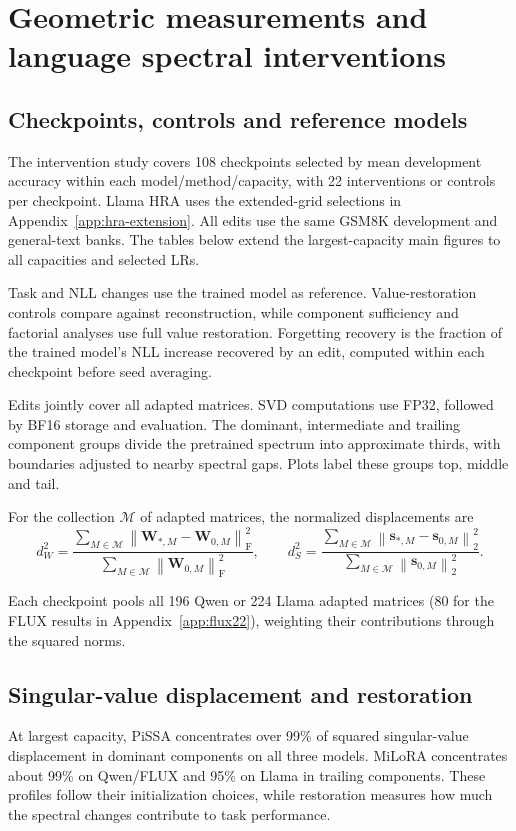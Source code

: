 \section{Geometric measurements and language spectral interventions}\label{app:complete-interventions}
\FloatBarrier
\subsection{Checkpoints, controls and reference models}
The intervention study covers 108 checkpoints selected by mean development accuracy within each model/method/capacity, with 22 interventions or controls per checkpoint. Llama HRA uses the extended-grid selections in Appendix~\ref{app:hra-extension}. All edits use the same GSM8K development and general-text banks. The tables below extend the largest-capacity main figures to all capacities and selected LRs.

Task and NLL changes use the trained model as reference. Value-restoration controls compare against reconstruction, while component sufficiency and factorial analyses use full value restoration. Forgetting recovery is the fraction of the trained model's NLL increase recovered by an edit, computed within each checkpoint before seed averaging.

Edits jointly cover all adapted matrices. SVD computations use FP32, followed by BF16 storage and evaluation. The dominant, intermediate and trailing component groups divide the pretrained spectrum into approximate thirds, with boundaries adjusted to nearby spectral gaps. Plots label these groups top, middle and tail.

For the collection $\mathcal M$ of adapted matrices, the normalized displacements are
\begin{equation*}
 d_W^2=\frac{\sum_{M\in\mathcal M}\left\|\bm W_{*,M}-\bm W_{0,M}\right\|_{\mathrm F}^2}{\sum_{M\in\mathcal M}\left\|\bm W_{0,M}\right\|_{\mathrm F}^2},\qquad
 d_S^2=\frac{\sum_{M\in\mathcal M}\left\|\bm s_{*,M}-\bm s_{0,M}\right\|_2^2}{\sum_{M\in\mathcal M}\left\|\bm s_{0,M}\right\|_2^2}.
\end{equation*}

Each checkpoint pools all 196 Qwen or 224 Llama adapted matrices (80 for the FLUX results in Appendix~\ref{app:flux22}), weighting their contributions through the squared norms.



\FloatBarrier
{}
\subsection{Singular-value displacement and restoration}
At largest capacity, PiSSA concentrates over 99\% of squared singular-value displacement in dominant components on all three models. MiLoRA concentrates about 99\% on Qwen/FLUX and 95\% on Llama in trailing components. These profiles follow their initialization choices, while restoration measures how much the spectral changes contribute to task performance.

